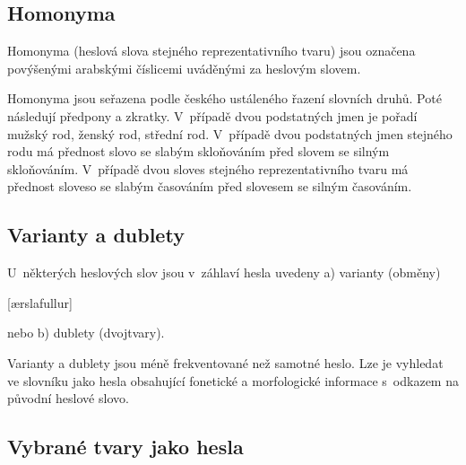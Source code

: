 \subsection*{Homonyma}

Homonyma (heslová slova stejného reprezentativního tvaru) jsou označena povýšenými arabskými číslicemi uváděnými za heslovým slovem.

\blspace
  \dicEntry {}  
  \dicEntry {}  
\blspace

Homonyma jsou seřazena podle českého ustáleného řazení slovních druhů. Poté následují předpony a zkratky.
V~případě dvou podstatných jmen je pořadí mužský rod, ženský rod, střední rod. V~případě dvou podstatných jmen stejného rodu má přednost slovo se slabým skloňováním před slovem se silným skloňováním. V~případě dvou sloves stejného reprezentativního tvaru má přednost sloveso se slabým časováním před slovesem se silným časováním.

\subsection*{Varianty a dublety}

U~některých heslových slov jsou v~záhlaví hesla uvedeny a) varianty (obměny)

\blspace
  \dicEntry {}[ærslafullur] 
\blspace

nebo b) dublety (dvojtvary).

\blspace
  \dicEntry {} 
\blspace

Varianty a dublety jsou méně frekventované než samotné heslo. Lze je vyhledat ve slovníku jako hesla obsahující fonetické a morfologické informace s~odkazem na původní heslové slovo.

\blspace
  \dicEntry {}    
  \dicEntry {}    
\blspace

\subsection*{Vybrané tvary jako hesla}


